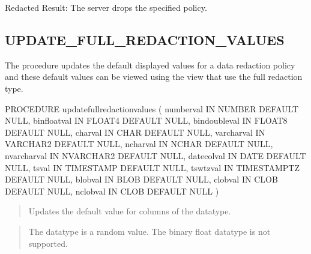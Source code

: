 \documentclass[letterpaper,10pt,english,openany,oneside]{sphinxmanual}
\begin{document}
Redacted Result: The server drops the specified policy.

\newpage


\subsection{UPDATE\_FULL\_REDACTION\_VALUES}
\label{\detokenize{dbms_redact:update-full-redaction-values}}
The  procedure updates the default
displayed values for a data redaction policy and these default values
can be viewed using the  view that use
the full redaction type.

%
\begin{sphinxVerbatim}[commandchars=\\\{\}]
PROCEDURE update\PYGZus{}full\PYGZus{}redaction\PYGZus{}values (
number\PYGZus{}val          IN NUMBER                DEFAULT NULL,
binfloat\PYGZus{}val        IN FLOAT4                DEFAULT NULL,
bindouble\PYGZus{}val       IN FLOAT8                DEFAULT NULL,
char\PYGZus{}val            IN CHAR                  DEFAULT NULL,
varchar\PYGZus{}val         IN VARCHAR2              DEFAULT NULL,
nchar\PYGZus{}val           IN NCHAR                 DEFAULT NULL,
nvarchar\PYGZus{}val        IN NVARCHAR2             DEFAULT NULL,
datecol\PYGZus{}val         IN DATE                  DEFAULT NULL,
ts\PYGZus{}val              IN TIMESTAMP             DEFAULT NULL,
tswtz\PYGZus{}val           IN TIMESTAMPTZ           DEFAULT NULL,
blob\PYGZus{}val            IN BLOB                  DEFAULT NULL,
clob\PYGZus{}val            IN CLOB                  DEFAULT NULL,
nclob\PYGZus{}val           IN CLOB                  DEFAULT NULL
)
\end{sphinxVerbatim}


\begin{quote}

Updates the default value for columns of the  datatype.
\end{quote}

\begin{quote}

The  datatype is a random value. The binary float datatype is not
supported.
\end{quote}
\end{document}
